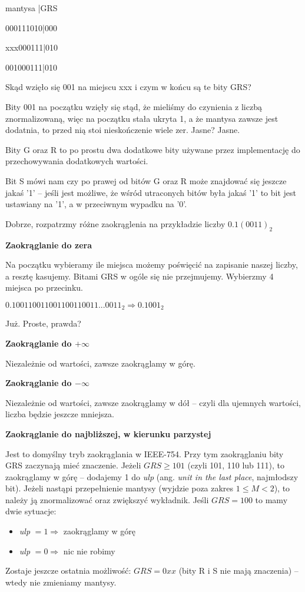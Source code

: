 mantysa |GRS

000111010|000

xxx000111|010

001000111|010

Skąd wzięło się 001 na miejscu xxx i czym w końcu są te bity GRS?

Bity 001 na początku wzięły się stąd, że mieliśmy do czynienia z liczbą znormalizowaną, więc na początku stała ukryta 1, a że mantysa zawsze jest dodatnia, to przed nią stoi nieskończenie wiele zer.
Jasne? Jasne.

Bity G oraz R to po prostu dwa dodatkowe bity używane przez implementację do przechowywania dodatkowych wartości.

Bit S mówi nam czy po prawej od bitów G oraz R może znajdować się jeszcze jakaś '1' -- jeśli jest możliwe, że wśród utraconych bitów była jakaś '1' to bit jest ustawiany na '1', a w przeciwnym wypadku na '0'.

Dobrze, rozpatrzmy różne zaokrąglenia na przykładzie liczby $0.1(0011)_2$

\textbf{Zaokrąglanie do zera}

Na początku wybieramy ile miejsca możemy poświęcić na zapisanie naszej liczby, a resztę kasujemy. Bitami GRS w ogóle się nie przejmujemy.
Wybierzmy 4 miejsca po przecinku.

$0.100110011001100110011...0011_2 \Rightarrow 0.1001_2$

Już. Proste, prawda?

\textbf{Zaokrąglanie do $+\infty$}

Niezależnie od wartości, zawsze zaokrąglamy w górę.

\textbf{Zaokrąglanie do $-\infty$}

Niezależnie od wartości, zawsze zaokrąglamy w dół -- czyli dla ujemnych wartości, liczba będzie jeszcze mniejsza.

\textbf{Zaokrąglanie do najbliższej, w kierunku parzystej}

Jest to domyślny tryb zaokrąglania w IEEE-754. Przy tym zaokrąglaniu bity GRS zaczynają mieć znaczenie. Jeżeli $GRS \ge 101$ (czyli 101, 110 lub 111), to zaokrąglamy w górę -- dodajemy 1 do \textit{ulp} (ang. \textit{unit in the last place}, najmłodszy bit). Jeżeli nastąpi przepełnienie mantysy (wyjdzie poza zakres $1 \le M < 2$), to należy ją znormalizować oraz zwiększyć wykładnik. Jeśli $GRS = 100$ to mamy dwie sytuacje:
\begin{itemize}
	\setlength\itemsep{1pt}
	\item \textit{ulp} $= 1 \Rightarrow$ zaokrąglamy w górę
	\item \textit{ulp} $= 0 \Rightarrow$ nic nie robimy
\end{itemize}
Zostaje jeszcze ostatnia możliwość: $GRS = 0xx$ (bity R i S nie mają znaczenia) -- wtedy nie zmieniamy mantysy.

